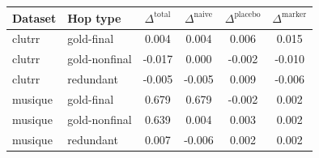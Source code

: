 \begin{tabular}{llcccc}
\toprule
Dataset & Hop type & $\Delta^{\text{total}}$ & $\Delta^{\text{naive}}$ & $\Delta^{\text{placebo}}$ & $\Delta^{\text{marker}}$ \\
\midrule
clutrr & gold-final & 0.004 & 0.004 & 0.006 & 0.015 \\
clutrr & gold-nonfinal & -0.017 & 0.000 & -0.002 & -0.010 \\
clutrr & redundant & -0.005 & -0.005 & 0.009 & -0.006 \\
musique & gold-final & 0.679 & 0.679 & -0.002 & 0.002 \\
musique & gold-nonfinal & 0.639 & 0.004 & 0.003 & 0.002 \\
musique & redundant & 0.007 & -0.006 & 0.002 & 0.002 \\
\bottomrule
\end{tabular}
